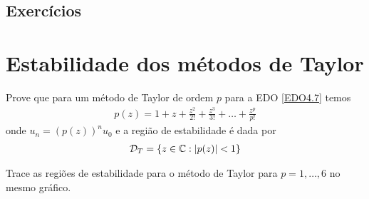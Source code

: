 \emconstrucao

\subsection*{Exercícios}

\emconstrucao

\section{Estabilidade dos métodos de Taylor}
\begin{ex}
Prove que para um método de Taylor de ordem $p$ para a EDO \eqref{EDO4.7} temos
\begin{eqnarray}
  p(z)= 1 + z+ \frac{z^2}{2!} +\frac{z^3}{3!}+\ldots +\frac{z^p}{p!}
\end{eqnarray}
onde  $u_n = (p(z))^nu_0$ e a região de estabilidade é dada por
\begin{eqnarray}
 \mathcal D_{T} = \{z \in  \mathbb{C}:  \left|p(z)\right|<1\}
\end{eqnarray}

Trace as regiões de estabilidade para o método de Taylor para $p=1,\ldots ,6$ no mesmo gráfico.
\end{ex}



